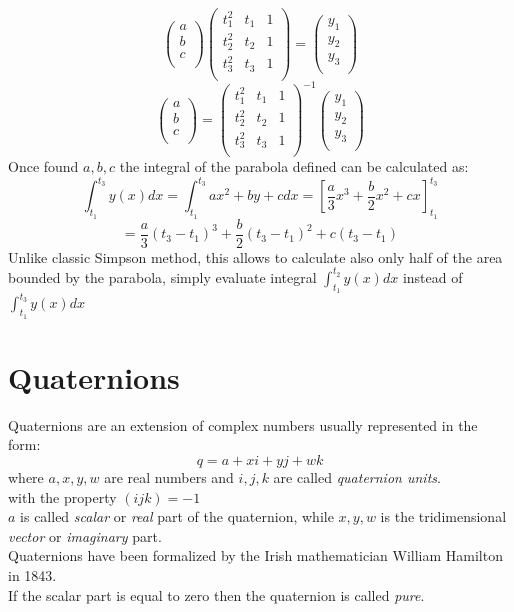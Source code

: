 $$ 
\begin{pmatrix}
a \\
b \\
c \\
\end{pmatrix}
\begin{pmatrix}
t_1^2 & t_1 & 1 \\
t_2^2 & t_2 & 1 \\
t_3^2 & t_3 & 1 \\
\end{pmatrix}
=
\begin{pmatrix}
y_1 \\
y_2 \\
y_3 \\
\end{pmatrix}
$$
$$ 
\begin{pmatrix}
a \\
b \\
c \\
\end{pmatrix}
=
\begin{pmatrix}
t_1^2 & t_1 & 1 \\
t_2^2 & t_2 & 1 \\
t_3^2 & t_3 & 1 \\
\end{pmatrix}^{-1}
\begin{pmatrix}
y_1 \\
y_2 \\
y_3 \\
\end{pmatrix}
$$
Once found $a,b,c$ the integral of the parabola defined can be calculated as:
$$
\int_{t_1}^{t_3} y(x)dx = \int_{t_1}^{t_3} ax^2 + by + c dx = [\frac{a}{3}x^3+\frac{b}{2}x^2+c{x}]_{t_1}^{t_3} 
$$
$$= \frac{a}{3}(t_3-t_1)^3+\frac{b}{2}(t_3-t_1)^2+c(t_3-t_1)$$
Unlike classic Simpson method, this allows to calculate also only half of the area bounded by the parabola, simply evaluate integral $\int_{t_1}^{t_2} y(x)dx$ instead of $\int_{t_1}^{t_3} y(x)dx $
\section{Quaternions}
Quaternions are an extension of complex numbers usually represented in the form:
$$ q = a + xi + yj + wk $$
where $a, x, y, w$ are real numbers and $i, j, k$ are called \textit{quaternion units}. \\
with the property ${(ijk)=-1}$  \\
$a$ is called \textit{scalar} or \textit{real} part of the quaternion, while $x,y,w$ is the tridimensional \textit{vector} or \textit{imaginary} part. \cite{amslaurea6701} \\
Quaternions have been formalized by the Irish mathematician William Hamilton in 1843. \\
If the scalar part is equal to zero then the quaternion is called \textit{pure}.

